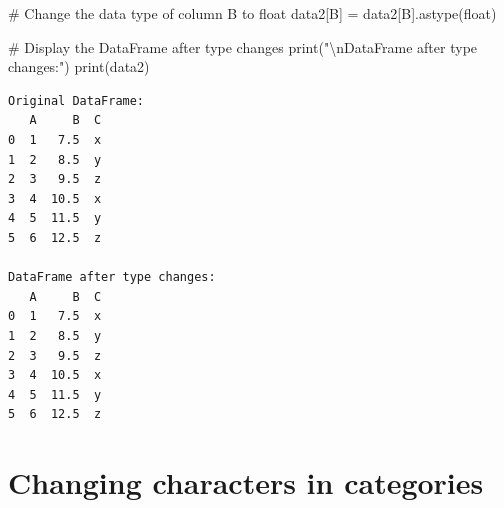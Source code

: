 \documentclass[
  english,
  letterpaper,
  DIV=11,
  numbers=noendperiod]{scrreprt}
\newenvironment{Shaded}{\begin{snugshade}}{\end{snugshade}}
\newcommand{\BuiltInTok}[1]{\textcolor[rgb]{0.00,0.23,0.31}{#1}}
\newcommand{\CharTok}[1]{\textcolor[rgb]{0.13,0.47,0.30}{#1}}
\newcommand{\CommentTok}[1]{\textcolor[rgb]{0.37,0.37,0.37}{#1}}
\newcommand{\NormalTok}[1]{\textcolor[rgb]{0.00,0.23,0.31}{#1}}
\newcommand{\OperatorTok}[1]{\textcolor[rgb]{0.37,0.37,0.37}{#1}}
\newcommand{\StringTok}[1]{\textcolor[rgb]{0.13,0.47,0.30}{#1}}
\begin{document}
\begin{Shaded}
\begin{Highlighting}[]
\CommentTok{\# Change the data type of column \textquotesingle{}B\textquotesingle{} to float}
\NormalTok{data2[}\StringTok{\textquotesingle{}B\textquotesingle{}}\NormalTok{] }\OperatorTok{=}\NormalTok{ data2[}\StringTok{\textquotesingle{}B\textquotesingle{}}\NormalTok{].astype(}\BuiltInTok{float}\NormalTok{)}

\CommentTok{\# Display the DataFrame after type changes}
\BuiltInTok{print}\NormalTok{(}\StringTok{"}\CharTok{\textbackslash{}n}\StringTok{DataFrame after type changes:"}\NormalTok{)}
\BuiltInTok{print}\NormalTok{(data2)}
\end{Highlighting}
\end{Shaded}

\begin{verbatim}
Original DataFrame:
   A     B  C
0  1   7.5  x
1  2   8.5  y
2  3   9.5  z
3  4  10.5  x
4  5  11.5  y
5  6  12.5  z

DataFrame after type changes:
   A     B  C
0  1   7.5  x
1  2   8.5  y
2  3   9.5  z
3  4  10.5  x
4  5  11.5  y
5  6  12.5  z
\end{verbatim}

\section{Changing characters in
categories}\label{changing-characters-in-categories}
\end{document}
